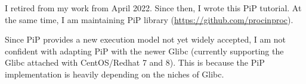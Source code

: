 
I retired from my work from April 2022. Since then, I wrote this PiP
tutorial. At the same time, I am maintaining PiP library
(\url{https://github.com/procinproc}).



Since PiP provides a new execution model not yet widely accepted, I am
not confident with adapting PiP with the newer Glibc (currently
supporting the Glibc attached with CentOS/Redhat 7 and 8). This is
because the PiP implementation is heavily depending on the niches of
Glibc. 
